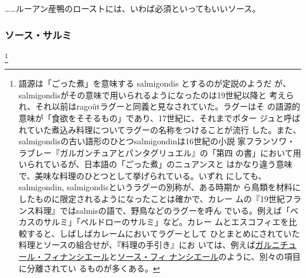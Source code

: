 \begin{recette}
\ldots{}\ldots{}ルーアン産鴨のローストには、いわば必須といってもいいソース。

\hypertarget{sauce-salmis}{%
\subsubsection{ソース・サルミ}\label{sauce-salmis}}

\footnote{語源は「ごった煮」を意味する salmigondis
  とするのが定説のようだ
  が、salmigondisがその意味で用いられるようになったのは19世紀以降と
  考えられ、それ以前はragoûtラグーと同義と見なされていた。ラグーはそ
  の語源的意味が「食欲をそそるもの」であり、17世紀に、それまでポター
  ジュと呼ばれていた煮込み料理についてラグーの名称をつけることが流行
  した。また、salmigondisの古い語形のひとつsalmigondinは16世紀の小説
  家フランソワ・ラブレー『ガルガンチュアとパンタグリュエル』の「第四
  の書」において用いられているが、日本語の「ごった煮」のニュアンスと
  はかなり違う意味で、美味な料理のひとつとして挙げられている。いずれ
  にしても、salmigondin, salmigondisというラグーの別称が、ある時期か
  ら鳥類を材料にしたものに限定されるようになったことは確かで、カレー
  ムの『19世紀フランス料理』ではsalmisの語で、野鳥などのラグーを呼ん
  でいる。例えば「ベカスのサルミ」「ペルドローのサルミ」など。カレー
  ムとエスコフィエを比較すると、しばしばカレームにおいてラグーとして
  ひとまとめにされていた料理とソースの組合せが、『料理の手引き』にお
  いては、例えば\protect\hyperlink{garniture-financiere}{ガルニチュール・フィナンシエール}と\protect\hyperlink{sauce-financiere}{ソース・フィ
  ナンシエール}のように、別々の項目に分離されてい るものが多くある。}



\end{recette}
